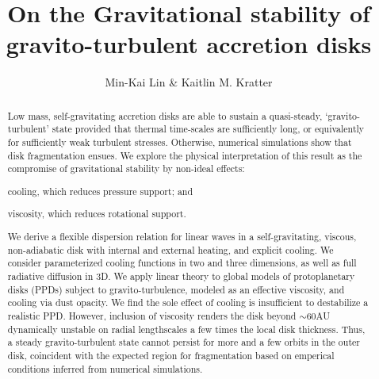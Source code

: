 \documentclass[iop, numberedappendix]{emulateapj}
\begin{document}
\title{On the Gravitational stability of gravito-turbulent accretion disks}
\author{Min-Kai Lin \& Kaitlin M. Kratter}

\begin{abstract}
Low mass, self-gravitating accretion disks are able to sustain a  
quasi-steady, `gravito-turbulent' state provided that thermal 
time-scales are sufficiently long, or equivalently for sufficiently
weak turbulent stresses. Otherwise, numerical simulations show that
disk fragmentation ensues.   
We explore the physical interpretation of this result as the
compromise of gravitational stability by non-ideal effects: 
\begin{inparaenum}[1)] 
\item cooling, which reduces pressure support; and
\item viscosity, which reduces rotational support. 
\end{inparaenum}
We derive a flexible dispersion relation for linear waves in a 
self-gravitating, viscous, non-adiabatic disk with internal and
external heating, and explicit cooling. We 
consider parameterized cooling functions in two and three dimensions,
as well as full radiative diffusion in 3D. 
We apply linear theory to 
global models of protoplanetary disks (PPDs) subject to gravito-turbulence, modeled as an effective
viscosity, and cooling via dust opacity. We find the sole effect of cooling is insufficient to
destabilize a realistic PPD. However, inclusion of viscosity renders
the disk beyond $\sim 60$AU dynamically unstable on radial 
lengthscales a few times the local disk thickness. 
Thus, a steady gravito-turbulent state cannot persist for more and a
few orbits in the outer disk, coincident with the expected region for
fragmentation based on emperical conditions inferred from numerical
simulations. 
\end{abstract}
\end{document}
